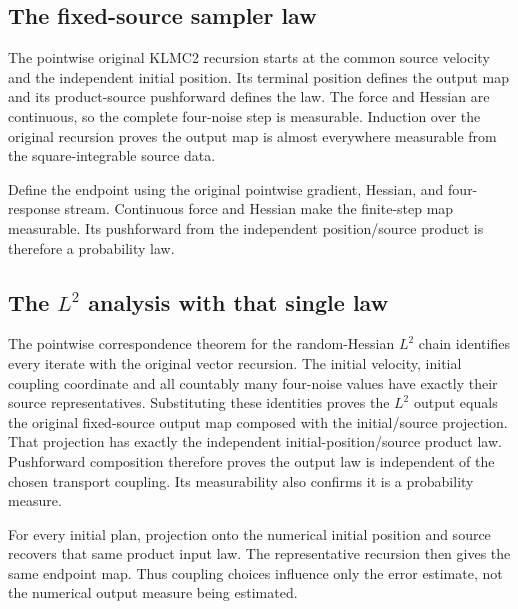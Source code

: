 \documentclass[11pt,a4paper]{report}
\begin{document}
\subsection{\texorpdfstring{The fixed-source sampler law}{The fixed-source sampler law}}
\label{report-step-KineticLangevin-KLMC2ProductLaw-lean-2}


The pointwise original KLMC2 recursion starts at the common source velocity and the independent initial position. Its terminal position defines the output map and its product-source pushforward defines the law. The force and Hessian are continuous, so the complete four-noise step is measurable. Induction over the original recursion proves the output map is almost everywhere measurable from the square-integrable source data.



Define the endpoint using the original pointwise gradient, Hessian, and four-response stream. Continuous force and Hessian make the finite-step map measurable. Its pushforward from the independent position/\allowbreak{}source product is therefore a probability law.

\subsection{\texorpdfstring{The \(L^{2}\) analysis with that single law}{The L² analysis with that single law}}
\label{report-step-KineticLangevin-KLMC2ProductLaw-lean-3}


The pointwise correspondence theorem for the random-Hessian \(L^{2}\) chain identifies every iterate with the original vector recursion. The initial velocity, initial coupling coordinate and all countably many four-noise values have exactly their source representatives. Substituting these identities proves the \(L^{2}\) output equals the original fixed-source output map composed with the initial/\allowbreak{}source projection. That projection has exactly the independent initial-position/\allowbreak{}source product law. Pushforward composition therefore proves the output law is independent of the chosen transport coupling. Its measurability also confirms it is a probability measure.



For every initial plan, projection onto the numerical initial position and source recovers that same product input law. The representative recursion then gives the same endpoint map. Thus coupling choices influence only the error estimate, not the numerical output measure being estimated.
\end{document}
